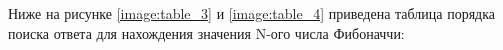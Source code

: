 Ниже на рисунке \ref{image:table_3} и \ref{image:table_4} приведена таблица порядка поиска ответа для нахождения значения N-ого числа Фибоначчи:
\begin{figure}[H]
\end{figure}

